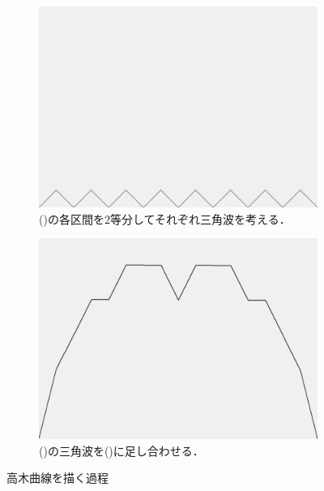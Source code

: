 \documentclass[dvipdfmx]{jsarticle}
\theoremstyle{definition}
\begin{document}
\begin{figure}[H]
    \begin{subfigure}{0.24\textwidth}
        \centering
        \includegraphics[width=\textwidth]{figure/takagi/takagiwave4.png}
        \caption{()の各区間を2等分してそれぞれ三角波を考える．}
        \label{fig_proc_takagiwave4}
    \end{subfigure}
    \begin{subfigure}{0.24\textwidth}
        \centering
        \includegraphics[width=\textwidth]{figure/takagi/takagicurve4.png}
        \caption{()の三角波を()に足し合わせる．}
        \label{fig_proc_takagicurve4}
    \end{subfigure}
    \caption{高木曲線を描く過程}
    \label{fig_process_takagi_curve}
\end{figure}
\end{document}
